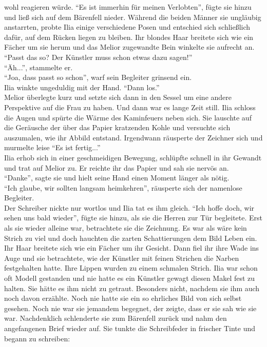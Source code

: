 wohl reagieren würde. ``Es ist immerhin für meinen Verlobten'', fügte sie hinzu und ließ sich auf 
dem Bärenfell nieder. Während die beiden Männer sie ungläubig anstarrten, probte Ilia einige 
verschiedene Posen und entschied sich schließlich dafür, auf dem Rücken liegen zu bleiben. Ihr 
blondes Haar breitete sich wie ein Fächer um sie herum und das Melior zugewandte Bein winkelte sie 
aufrecht an. ``Passt das so? Der Künstler muss schon etwas dazu sagen!''\\
``Äh...'', stammelte er.\\
``Joa, dass passt so schon'', warf sein Begleiter grinsend ein.\\
Ilia winkte ungeduldig mit der Hand. ``Dann los.''\\
Melior überlegte kurz und setzte sich dann in den Sessel um eine andere Perspektive auf die Frau zu 
haben. Und dann war es lange Zeit still. Ilia schloss die Augen und spürte die Wärme des 
Kaminfeuers neben sich. Sie lauschte auf die Geräusche der über das Papier kratzenden Kohle und 
versuchte sich auszumalen, wie ihr Abbild entstand. Irgendwann räusperte der Zeichner sich und 
murmelte leise ``Es ist fertig...''\\
Ilia erhob sich in einer geschmeidigen Bewegung, schlüpfte schnell in ihr Gewandt und trat auf 
Melior zu. Er reichte ihr das Papier und sah sie nervös an.\\
``Danke'', sagte sie und hielt seine Hand einen Moment länger als nötig.\\
``Ich glaube, wir sollten langsam heimkehren'', räusperte sich der namenlose Begleiter.\\
Der Schreiber nickte nur wortlos und Ilia tat es ihm gleich. ``Ich hoffe doch, wir sehen uns bald 
wieder'', fügte sie hinzu, als sie die Herren zur Tür begleitete. Erst als sie wieder alleine war, 
betrachtete sie die Zeichnung. Es war als wäre kein Strich zu viel und doch hauchten die zarten 
Schattierungen dem Bild Leben ein. Ihr Haar breitete sich wie ein Fächer um ihr Gesicht. Dann fiel 
ihr ihre Wade ins Auge und sie betrachtete, wie der Künstler mit feinen Strichen die Narben 
festgehalten hatte. Ihre Lippen wurden zu einem schmalen Strich. Ilia war schon oft Modell 
gestanden und nie hatte es ein Künstler gewagt diesen Makel fest zu halten. Sie hätte es ihm 
nicht zu getraut. Besonders nicht, nachdem sie ihm auch noch davon erzählte. Noch nie hatte sie ein 
so ehrliches Bild von sich selbst gesehen. Noch nie war sie jemandem begegnet, der zeigte, dass er 
sie sah wie sie war. Nachdenklich schlenderte sie zum Bärenfell zurück und nahm den angefangenen 
Brief wieder auf. Sie tunkte die Schreibfeder in frischer Tinte und begann zu schreiben:

